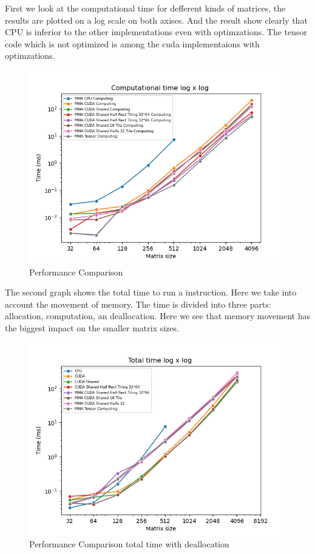 \documentclass[conference]{IEEEtran}
\begin{document}
  First we look at the computational time for defferent kinds of matrices,
  the results are plotted on a log scale on both axises. And the result show clearly that
  CPU is inferior to the other implementations even with optimzations.
  The tensor code which is not optimized is among the cuda implementaions with optimzations.

  \begin{figure}[h]
    \centering
    \includegraphics[scale=0.5]{figures/Comp_time.png}
    \caption{Performance Comparison}
    \label{fig:performance-comparison}
  \end{figure}

  The second graph shows the total time to run a instruction. Here we take into account the movement of memory.
  The time is divided into three parts: allocation, computation, an deallocation.
  Here we see that memory movement has the biggest impact on the smaller matrix sizes.


  \begin{figure}[h]
    \centering
    \includegraphics[scale=0.5]{figures/Tot_time_deac.png}
    \caption{Performance Comparison total time with deallocation}
    \label{fig:time-comparison}
  \end{figure}
\end{document}
